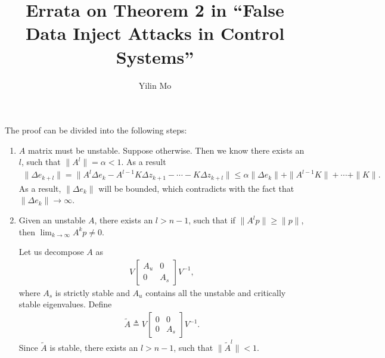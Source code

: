 \documentclass{article}
\title{Errata on Theorem 2 in ``False Data Inject Attacks in Control Systems''}
\author{Yilin Mo}
\begin{document}
 \maketitle
The proof can be divided into the following steps:
\begin{enumerate}
\item $A$ matrix must be unstable. Suppose otherwise. Then we know there exists an $l$, such that $\|A^l\| = \alpha < 1$. As a result
  \begin{align*}
   \|\Delta e_{k+l}\| = \|A^l\Delta e_k - A^{l-1}K\Delta z_{k+1} -\cdots - K \Delta z_{k+l}\| \leq \alpha \|\Delta e_k\| + \|A^{l-1}K\| + \cdots + \|K\|.
  \end{align*}
  As a result, $\|\Delta e_k\|$ will be bounded, which contradicts with the fact that $\|\Delta e_k\|  \rightarrow \infty$.
\item Given an unstable $A$, there exists an $l > n-1$, such that if $\|A^lp\| \geq \|p\|$, then $\lim_{k\rightarrow\infty} A^kp \neq 0$.

  Let us decompose $A$ as
  \begin{align*}
    V \begin{bmatrix}
      A_u&0\\
      0&A_s
    \end{bmatrix}V^{-1},
  \end{align*}
 where $A_s$ is strictly stable and $A_u$ contains all the unstable and critically stable eigenvalues. Define
  \begin{align*}
    \tilde A \triangleq  V \begin{bmatrix}
      0&0\\
      0&A_s
    \end{bmatrix}V^{-1}.
  \end{align*}
Since $\tilde A$ is stable, there exists an $l > n-1$, such that $\|\tilde A^l\|  <1$. 


\end{enumerate}
\end{document}
